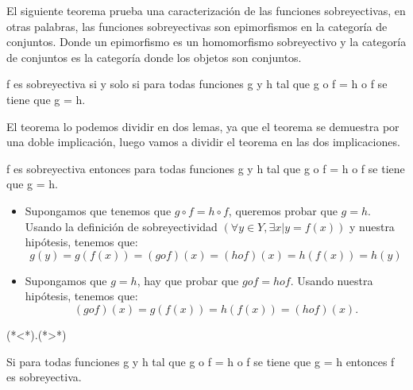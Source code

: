 %
\begin{isabellebody}%
%
%
\isadelimtheory
%
\endisadelimtheory
%
\isatagtheory
%
\endisatagtheory
{\isafoldtheory}%
%
\isadelimtheory
%
\endisadelimtheory
%
\isadelimdocument
%
\endisadelimdocument
%
\isatagdocument
%
\isamarkuptrue%
%
\endisatagdocument
{\isafolddocument}%
%
\isadelimdocument
%
\endisadelimdocument
%
\begin{isamarkuptext}%
El siguiente teorema prueba una caracterización de las funciones
 sobreyectivas, en otras palabras, las funciones sobreyectivas son
 epimorfismos en la categoría de conjuntos. Donde un epimorfismo es un
 homomorfismo sobreyectivo y la categoría de conjuntos es la categoría
 donde los objetos son conjuntos.


\begin {teorema}
  f es sobreyectiva si y solo si  para todas funciones g y h tal que g o f
 = h o f se tiene que g = h.
\end {teorema}
 
El teorema lo podemos dividir en dos lemas, ya que el teorema se
 demuestra por una doble implicación, luego vamos a dividir el teorema
 en las dos implicaciones.

\begin {lema}
  f es sobreyectiva entonces  para todas funciones g y h tal que g o f
 = h o f se tiene que g = h.
\end {lema}
\begin {demostracion}
\begin {itemize}
\item Supongamos que tenemos que $g \circ  f = h \circ f$, queremos probar que $g =
 h.$ Usando la definición de sobreyectividad $(\forall y \in Y,
 \exists x | y = f(x))$ y nuestra hipótesis, tenemos que:
$$g(y) = g(f(x)) = (g o f) (x) = (h o f) (x) = h(f(x)) = h(y)$$
\item Supongamos que $g = h$, hay que probar que $g o f = h o f.$ Usando
nuestra hipótesis, tenemos que:
$$ (g o f)(x) = g(f(x)) = h(f(x)) = (h o f) (x).$$
\end {itemize}
(*<*).(*>*)
\end {demostracion}

\begin {lema}
 Si  para todas funciones g y h tal que g o f  = h o f se tiene
 que g = h entonces f es sobreyectiva.
\end {lema}


\end{isamarkuptext}
\end{isabellebody}
